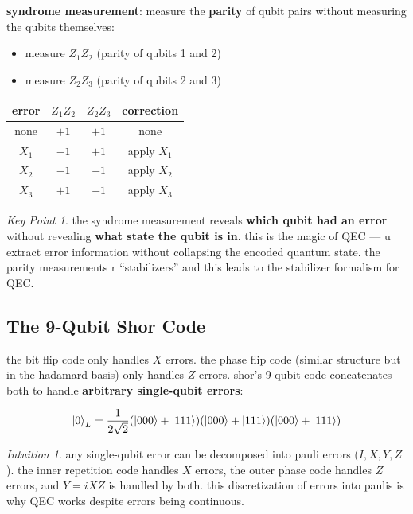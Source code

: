 \documentclass[11pt,a4paper]{article}
\theoremstyle{definition}
\theoremstyle{remark}
\newtheorem*{intuition}{Intuition}
\newtheorem*{keypoint}{Key Point}
\begin{document}
\textbf{syndrome measurement}: measure the \textbf{parity} of qubit pairs without measuring the qubits themselves:
\begin{itemize}
    \item measure $Z_1 Z_2$ (parity of qubits 1 and 2)
    \item measure $Z_2 Z_3$ (parity of qubits 2 and 3)
\end{itemize}

\begin{center}
\begin{tabular}{c|cc|c}
error & $Z_1 Z_2$ & $Z_2 Z_3$ & correction \\
\hline
none & $+1$ & $+1$ & none \\
$X_1$ & $-1$ & $+1$ & apply $X_1$ \\
$X_2$ & $-1$ & $-1$ & apply $X_2$ \\
$X_3$ & $+1$ & $-1$ & apply $X_3$
\end{tabular}
\end{center}

\begin{keypoint}
the syndrome measurement reveals \textbf{which qubit had an error} without revealing \textbf{what state the qubit is in}. this is the magic of QEC --- u extract error information without collapsing the encoded quantum state. the parity measurements r ``stabilizers'' and this leads to the stabilizer formalism for QEC.
\end{keypoint}

\subsection{The 9-Qubit Shor Code}

the bit flip code only handles $X$ errors. the phase flip code (similar structure but in the hadamard basis) only handles $Z$ errors. shor's 9-qubit code concatenates both to handle \textbf{arbitrary single-qubit errors}:

\[
\ket{0}_L = \frac{1}{2\sqrt{2}}(\ket{000} + \ket{111})(\ket{000} + \ket{111})(\ket{000} + \ket{111})
\]

\begin{intuition}
any single-qubit error can be decomposed into pauli errors ($I, X, Y, Z$). the inner repetition code handles $X$ errors, the outer phase code handles $Z$ errors, and $Y = iXZ$ is handled by both. this discretization of errors into paulis is why QEC works despite errors being continuous.
\end{intuition}
\end{document}
